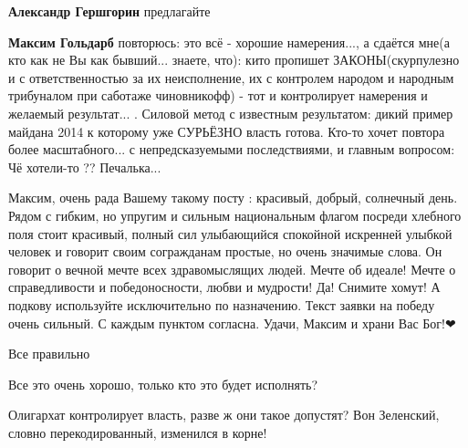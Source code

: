 \begin{itemize}
\begin{itemize}
\textbf{Александр Гершгорин} предлагайте

 
\textbf{Максим Гольдарб} повторюсь: это всё - хорошие намерения..., а сдаётся
мне(а кто как не Вы как бывший... знаете, что): кито пропишет
ЗАКОНЫ(скурпулезно и с ответственностью за их неисполнение, их с контролем
народом и народным трибуналом при саботаже чиновникофф) - тот и контролирует
намерения и желаемый результат... . Силовой метод с известным результатом:
дикий пример майдана 2014 к которому уже СУРЬЁЗНО власть готова. Кто-то хочет
повтора более масштабного... с непредсказуемыми последствиями, и главным
вопросом: Чё хотели-то ?? Печалька...

\end{itemize}


Максим, очень рада Вашему такому посту : красивый, добрый, солнечный день.
Рядом с гибким, но упругим и сильным национальным флагом посреди хлебного поля
стоит красивый, полный сил улыбающийся спокойной искренней улыбкой человек и
говорит своим согражданам простые, но очень значимые слова. Он говорит о вечной
мечте всех здравомыслящих людей. Мечте об идеале! Мечте о справедливости и
победоносности, любви и мудрости! Да! Снимите хомут! А подкову используйте
исключительно по назначению. Текст заявки на победу очень сильный. С каждым
пунктом согласна. Удачи, Максим и храни Вас Бог!❤

 
Все правильно


Все это очень хорошо, только кто это будет исполнять?

Олигархат контролирует власть, разве ж они такое допустят? Вон Зеленский,
словно перекодированный, изменился в корне!

\begin{itemize}
 

\end{itemize}
\end{itemize}
